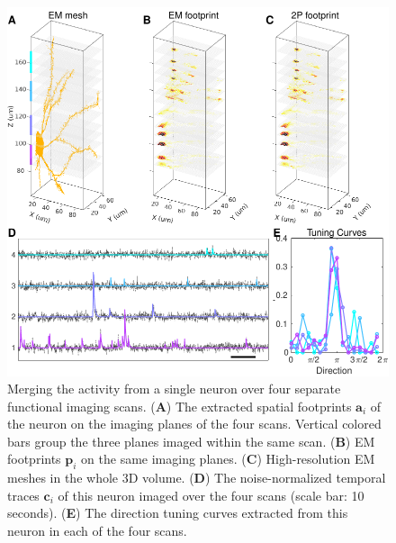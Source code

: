 \documentclass[10pt,letterpaper]{article}
\begin{document}
{%




\begin{figure}[t!]
	\centering
	\includegraphics[width=1\textwidth]{Figs/fig_multi_scan.pdf}
	\caption{Merging the activity from a single neuron over four separate functional imaging scans.  (\textbf{A}) The extracted spatial footprints $\bm{a}_i$ of the neuron on the imaging planes of the four scans. Vertical colored bars group the three planes imaged within the same scan. (\textbf{B}) EM footprints $\bm{p}_i$ on the same imaging planes. (\textbf{C}) High-resolution EM meshes in the whole 3D volume. (\textbf{D}) The noise-normalized temporal traces $\bm{c}_i$ of this neuron imaged over the four scans (scale bar: 10 seconds).  (\textbf{E}) The direction tuning curves extracted from this neuron in each of the four scans.}
\label{fig:multi_scan}
\end{figure}


}
\end{document}

